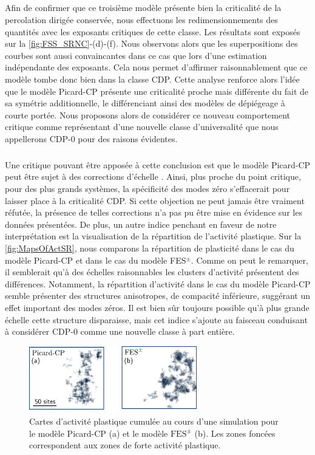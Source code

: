 \subparagraph{}Afin de confirmer que ce troisième modèle présente bien la criticalité de la percolation dirigée conservée, nous effectuons les redimensionnements des quantités avec les exposants critiques de cette classe. Les résultats sont exposés sur la \autoref{fig:FSS_SRNC}-(d)-(f). Nous observons alors que les superpositions des courbes sont aussi convaincantes dans ce cas que lors d'une estimation indépendante des exposants. Cela nous permet d'affirmer raisonnablement que ce modèle tombe donc bien dans la classe CDP. Cette analyse renforce alors l'idée que le modèle Picard-CP présente une criticalité proche mais différente du fait de sa symétrie additionnelle, le différenciant ainsi des modèles de dépiégeage à courte portée. Nous proposons alors de considérer ce nouveau comportement critique comme représentant d'une nouvelle classe d'universalité que nous appellerons CDP-0 pour des raisons évidentes.

\subparagraph{}Une critique pouvant être apposée à cette conclusion est que le modèle Picard-CP peut être sujet à des corrections d'échelle \cite{nishimori_elements_2015}. Ainsi, plus proche du point critique, pour des plus grands systèmes, la spécificité des modes zéro s'effacerait pour laisser place à la criticalité CDP. Si cette objection ne peut jamais être vraiment réfutée, la présence de telles corrections n'a pas pu être mise en évidence sur les données présentées. De plus, un autre indice penchant en faveur de notre interprétation est la visualisation de la répartition de l'activité plastique. Sur la \autoref{fig:MapsOfActSR}, nous comparons la répartition de plasticité dans le cas du modèle Picard-CP et dans le cas du modèle FES$^\pm$. Comme on peut le remarquer, il semblerait qu'à des échelles raisonnables les clusters d'activité présentent des différences. Notamment, la répartition d'activité dans le cas du modèle Picard-CP semble présenter des structures anisotropes, de compacité inférieure, suggérant un effet important des modes zéros. Il est bien sûr toujours possible qu'à plus grande échelle cette structure disparaisse, mais cet indice s'ajoute au faisceau conduisant à considérer CDP-0 comme une nouvelle classe à part entière.

\begin{figure}[h]
	\centering
	\includegraphics[width=0.65\textwidth]{Chapitre4/Figures/CourtePortee/MapsofActSR.pdf}
	\caption{Cartes d'activité plastique cumulée au cours d'une simulation pour le modèle Picard-CP (a) et le modèle $\text{FES}^\pm$ (b). Les zones foncées correspondent aux zones de forte activité plastique.}
	 \label{fig:MapsOfActSR}
\end{figure}

